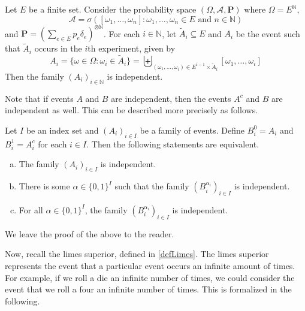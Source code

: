 \begin{theorem}
\label{product measure independence}
    Let $E$ be a finite set. Consider the probability space $(\Omega,\mathcal{A},\textbf{P})$ where $\Omega=E^\mathbb{N}$,
    $$\mathcal{A}=\sigma([\omega_1,\ldots,\omega_n]:\omega_1,\ldots,\omega_n\in E\text{ and }n\in\mathbb{N})$$
    and $\textbf{P}=\left(\sum_{e\in E}p_e\delta_e\right)^{\otimes\mathbb{N}}$. For each $i\in\mathbb{N}$, let $\tilde A_i\subseteq E$ and $A_i$ be the event such that $\tilde A_i$ occurs in the $i$th experiment, given by
    $$A_i = \{\omega\in\Omega:\omega_i\in\tilde A_i\}
    =\biguplus_{(\omega_1,\ldots,\omega_i)\in E^{i-1}\times \tilde A_i} [\omega_1,\ldots,\omega_i]$$
  Then the family $(A_i)_{i\in\mathbb{N}}$ is independent.
\end{theorem}


\vspace{2mm}
Note that if events $A$ and $B$ are independent, then the events $A^c$ and $B$ are independent as well. This can be described more precisely as follows.

\begin{theorem}
    Let $I$ be an index set and $(A_i)_{i\in I}$ be a family of events. Define $B_i^0 = A_i$ and $B_i^1 = A_i^c$ for each $i\in I$. Then the following statements are equivalent.
    \begin{enumerate}[(a)]
        \item The family $(A_i)_{i\in I}$ is independent.
        \item There is some $\alpha\in\{0,1\}^I$ such that the family $(B_i^{\alpha_i})_{i\in I}$ is independent.
        \item For all $\alpha\in\{0,1\}^I$, the family $(B_i^{\alpha_i})_{i\in I}$ is independent.
    \end{enumerate}
\end{theorem}

We leave the proof of the above to the reader.

Now, recall the limes superior, defined in \ref{defLimes}. The limes superior represents the event that a particular event occurs an infinite amount of times. For example, if we roll a die an infinite number of times, we could consider the event that we roll a four an infinite number of times. This is formalized in the following.

